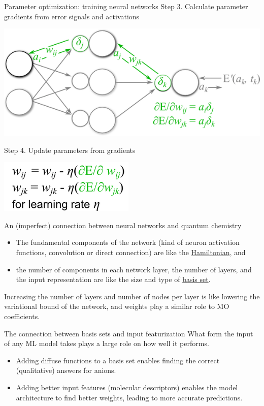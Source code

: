 \documentclass[compress]{beamer}
\begin{document}
\begin{frame}{Parameter optimization: training neural networks}
  Step 3. Calculate parameter gradients from error signals and activations
  \begin{center}
    \includegraphics[width=1.00\textwidth]{./figures/backprop_3.png}
  \end{center}
  Step 4. Update parameters from gradients
  \begin{center}
    \includegraphics[scale=0.50]{./figures/backprop_4.png}
  \end{center}
\end{frame}

\begin{frame}{An (imperfect) connection between neural networks and quantum chemistry}
  \begin{itemize}
  \item The fundamental components of the network (kind of neuron activation functions, convolution or direct connection) are like the \underline{Hamiltonian}, and
  \item the number of components in each network layer, the number of layers, and the input representation are like the size and type of \underline{basis set}.
  \end{itemize}
  Increasing the number of layers and number of nodes per layer is like lowering the variational bound of the network, and weights play a similar role to MO coefficients.
\end{frame}

\begin{frame}{The connection between basis sets and input featurization}
  What form the input of any ML model takes plays a large role on how well it performs.
  \begin{itemize}
  \item Adding diffuse functions to a basis set enables finding the correct (qualitative) answers for anions.
  \item Adding better input features (molecular descriptors) enables the model architecture to find better weights, leading to more accurate predictions.
  \end{itemize}
\end{frame}
\end{document}
